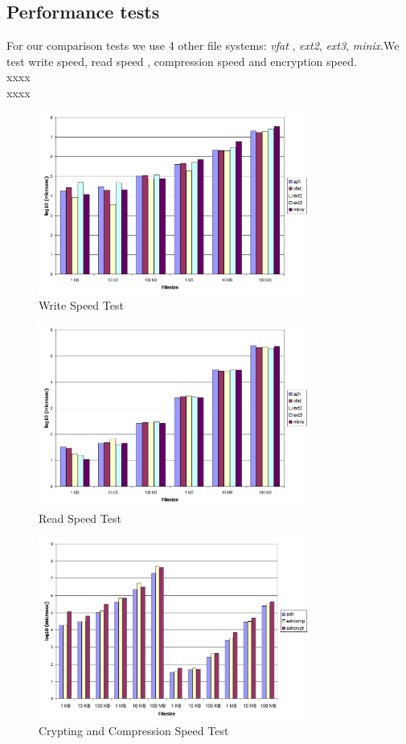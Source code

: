 \documentclass[conference]{IEEEtran}
\begin{document}
\subsection{Performance tests}
For our comparison tests we use 4 other file systems: {\em vfat } , {\em ext2}, {\em ext3}, {\em minix}.We test write speed, 
read speed , compression speed and encryption speed. \\

xxxx \\

xxxx \\


\begin{figure}[!t]
\centering
\includegraphics[width=3.5in]{writetest.jpg}
\caption{Write Speed Test}
\label{fig_wspeed}
\end{figure}


\begin{figure}[!t]
\centering
\includegraphics[width=3.5in]{readtest.jpg}
\caption{Read Speed Test}
\label{fig_rspeed}
\end{figure}



\begin{figure}[!t]
\centering
\includegraphics[width=3.5in]{features.jpg}
\caption{Crypting and Compression Speed Test}
\label{fig_fspeed}
\end{figure}
\end{document}
